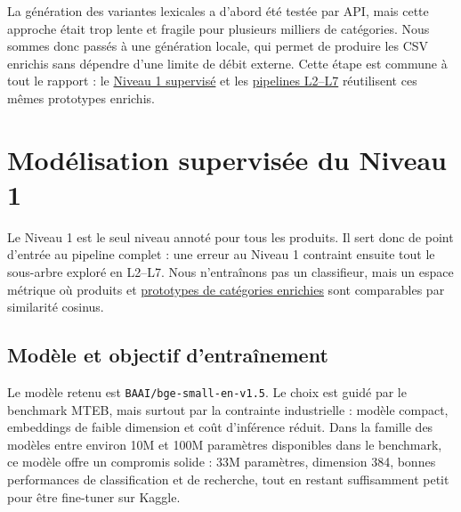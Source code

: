 \documentclass[12pt,a4paper]{report}
\begin{document}
La génération des variantes lexicales a d'abord été testée par API, mais cette approche était trop lente et fragile pour plusieurs milliers de catégories. Nous sommes donc passés à une génération locale, qui permet de produire les CSV enrichis sans dépendre d'une limite de débit externe. Cette étape est commune à tout le rapport : le \hyperref[chap:l1-supervised]{Niveau 1 supervisé} et les \hyperref[chap:l2-l7-zero-shot]{pipelines L2--L7} réutilisent ces mêmes prototypes enrichis.

\chapter{Modélisation supervisée du Niveau 1}
\label{chap:l1-supervised}

Le Niveau 1 est le seul niveau annoté pour tous les produits. Il sert donc de point d'entrée au pipeline complet : une erreur au Niveau 1 contraint ensuite tout le sous-arbre exploré en L2--L7. Nous n'entraînons pas un classifieur, mais un espace métrique où produits et \hyperref[chap:category-enrichment]{prototypes de catégories enrichies} sont comparables par similarité cosinus.

\section{Modèle et objectif d'entraînement}
\label{sec:l1-embedding-choice}
\label{sec:l1-training-objective}

Le modèle retenu est \texttt{BAAI/bge-small-en-v1.5}. Le choix est guidé par le benchmark MTEB, mais surtout par la contrainte industrielle : modèle compact, embeddings de faible dimension et coût d'inférence réduit. Dans la famille des modèles entre environ 10M et 100M paramètres disponibles dans le benchmark, ce modèle offre un compromis solide : 33M paramètres, dimension 384, bonnes performances de classification et de recherche, tout en restant suffisamment petit pour être fine-tuner sur Kaggle.

\begin{table}[H]
    \centering
    \caption{Synthèse du choix de l'encodeur L1}
    \label{tab:l1-mteb-compact-embedders-main}
\end{table}
\end{document}
